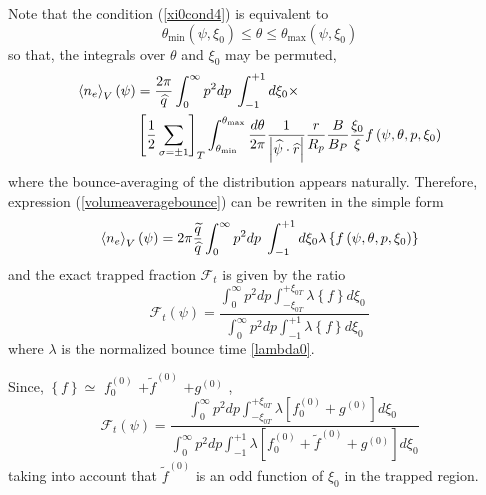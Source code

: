 Note that the condition (\ref{xi0cond4}) is equivalent to
\begin{equation}
\theta_{\min}\left( \psi,\xi_{0}\right) \leq\theta\leq\theta_{\max}\left(
\psi,\xi_{0}\right)
\end{equation}
so that, the integrals over $\theta$ and $\xi_{0}$ may be permuted,
\begin{align}
\left\langle n_{e}\right\rangle _{V}\left( \psi\right) & =\frac{2\pi }{%
\widehat{q}}\int_{0}^{\infty}p^{2}dp\;\int_{-1}^{+1}d\xi_{0}\times  \nonumber
\\
& \left[ \frac{1}{2}\sum_{\sigma=\pm1}\right]
_{T}\int_{\theta_{\min}}^{\theta_{\max}}\frac{d\theta}{2\pi}\frac{1}{\left|
\widehat{\psi}\cdot\widehat{r}\right| }\frac{r}{R_{p}}\frac{B}{B_{P}}\frac{
\xi_{0}}{\xi }f\left( \psi,\theta,p,\xi_{0}\right)
\label{volumeaveragebounce}
\end{align}
where the bounce-averaging of the distribution appears naturally. Therefore,
expression (\ref{volumeaveragebounce}) can be rewriten in the simple form
\begin{equation}
\left\langle n_{e}\right\rangle _{V}\left( \psi\right) =2\pi\frac {%
\widetilde{q}}{\widehat{q}}\int_{0}^{\infty}p^{2}dp\;\int_{-1}^{+1}d\xi
_{0}\lambda\left\{ f\left( \psi,\theta,p,\xi_{0}\right) \right\}
\end{equation}
and the exact trapped fraction $\mathcal{F}_{t}$ is given by the ratio
\begin{equation}
\mathcal{F}_{t}\left( \psi\right) =\frac{\int_{0}^{\infty}p^{2}dp\int
_{-\xi_{0T}}^{+\xi_{0T}}\lambda\left\{ f\right\} d\xi_{0}\;}{\int
_{0}^{\infty}p^{2}dp\int_{-1}^{+1}\lambda\left\{ f\right\} d\xi_{0}}
\end{equation}
where $\lambda$ is the normalized bounce time \ref{lambda0}.

Since, $\left\{ f\right\} \simeq$ $f_{0}^{\left( 0\right) }$ $+\widetilde{f}
^{\left( 0\right) }$ $+g^{\left( 0\right) }$ ,
\begin{equation}
\mathcal{F}_{t}\left( \psi\right) =\frac{\int_{0}^{\infty}p^{2}dp\int
_{-\xi_{0T}}^{+\xi_{0T}}\lambda\left[ f_{0}^{\left( 0\right) }+g^{\left(
0\right) }\right] d\xi_{0}\;}{\int_{0}^{\infty}p^{2}dp\int_{-1}^{+1}\lambda%
\left[ f_{0}^{\left( 0\right) }+\widetilde{f}^{\left( 0\right) }+g^{\left(
0\right) }\right] d\xi_{0}}
\end{equation}
taking into account that $\widetilde{f}^{\left( 0\right) }$ is an odd
function of $\xi_{0}$ in the trapped region.

